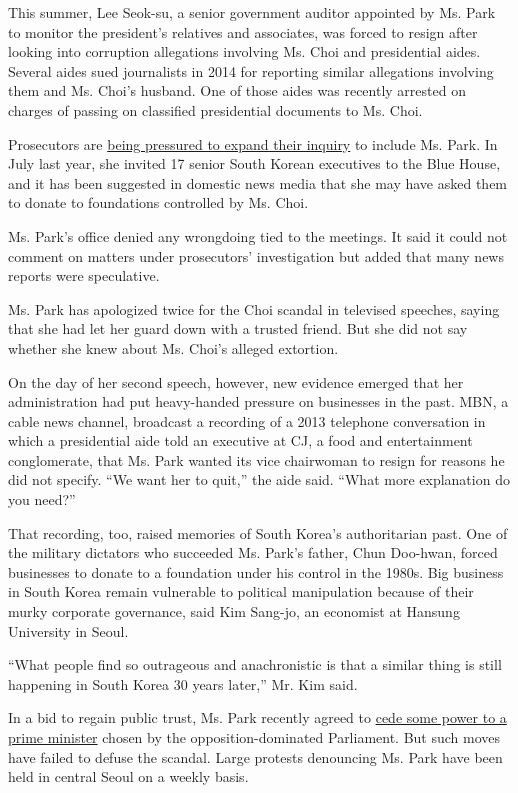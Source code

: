 This summer, Lee Seok-su, a senior government auditor appointed by Ms.
Park to monitor the president's relatives and associates, was forced to
resign after looking into corruption allegations involving Ms. Choi and
presidential aides. Several aides sued journalists in 2014 for reporting
similar allegations involving them and Ms. Choi's husband. One of those
aides was recently arrested on charges of passing on classified
presidential documents to Ms. Choi.

Prosecutors are
\href{http://www.nytimes3xbfgragh.onion/2016/11/04/world/asia/south-korea-park-geun-hye-investigation.html}{being
pressured to expand their inquiry} to include Ms. Park. In July last
year, she invited 17 senior South Korean executives to the Blue House,
and it has been suggested in domestic news media that she may have asked
them to donate to foundations controlled by Ms. Choi.

Ms. Park's office denied any wrongdoing tied to the meetings. It said it
could not comment on matters under prosecutors' investigation but added
that many news reports were speculative.

Ms. Park has apologized twice for the Choi scandal in televised
speeches, saying that she had let her guard down with a trusted friend.
But she did not say whether she knew about Ms. Choi's alleged extortion.

On the day of her second speech, however, new evidence emerged that her
administration had put heavy-handed pressure on businesses in the past.
MBN, a cable news channel, broadcast a recording of a 2013 telephone
conversation in which a presidential aide told an executive at CJ, a
food and entertainment conglomerate, that Ms. Park wanted its vice
chairwoman to resign for reasons he did not specify. ``We want her to
quit,'' the aide said. ``What more explanation do you need?''

That recording, too, raised memories of South Korea's authoritarian
past. One of the military dictators who succeeded Ms. Park's father,
Chun Doo-hwan, forced businesses to donate to a foundation under his
control in the 1980s. Big business in South Korea remain vulnerable to
political manipulation because of their murky corporate governance, said
Kim Sang-jo, an economist at Hansung University in Seoul.

``What people find so outrageous and anachronistic is that a similar
thing is still happening in South Korea 30 years later,'' Mr. Kim said.

In a bid to regain public trust, Ms. Park recently agreed to
\href{http://www.nytimes3xbfgragh.onion/2016/11/08/world/asia/south-korea-park-choi-scandal-parliament.html}{cede
some power to a prime minister} chosen by the opposition-dominated
Parliament. But such moves have failed to defuse the scandal. Large
protests denouncing Ms. Park have been held in central Seoul on a weekly
basis.

